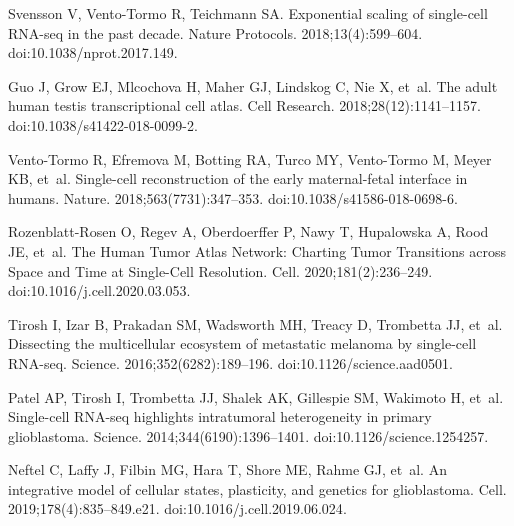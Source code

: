 \documentclass[10pt,letterpaper]{article}
\begin{document}
%
%
% 
\begin{thebibliography}{10}

Svensson V, Vento-Tormo R, Teichmann SA.
\newblock Exponential scaling of single-cell {RNA}-seq in the past decade.
\newblock Nature Protocols. 2018;13(4):599--604.
\newblock doi:{10.1038/nprot.2017.149}.

Guo J, Grow EJ, Mlcochova H, Maher GJ, Lindskog C, Nie X, et~al.
\newblock The adult human testis transcriptional cell atlas.
\newblock Cell Research. 2018;28(12):1141--1157.
\newblock doi:{10.1038/s41422-018-0099-2}.

Vento-Tormo R, Efremova M, Botting RA, Turco MY, Vento-Tormo M, Meyer KB,
  et~al.
\newblock Single-cell reconstruction of the early maternal-fetal interface in
  humans.
\newblock Nature. 2018;563(7731):347--353.
\newblock doi:{10.1038/s41586-018-0698-6}.

Rozenblatt-Rosen O, Regev A, Oberdoerffer P, Nawy T, Hupalowska A, Rood JE,
  et~al.
\newblock The Human Tumor Atlas Network: Charting Tumor Transitions across
  Space and Time at Single-Cell Resolution.
\newblock Cell. 2020;181(2):236--249.
\newblock doi:{10.1016/j.cell.2020.03.053}.

Tirosh I, Izar B, Prakadan SM, Wadsworth MH, Treacy D, Trombetta JJ, et~al.
\newblock Dissecting the multicellular ecosystem of metastatic melanoma by
  single-cell {RNA}-seq.
\newblock Science. 2016;352(6282):189--196.
\newblock doi:{10.1126/science.aad0501}.

Patel AP, Tirosh I, Trombetta JJ, Shalek AK, Gillespie SM, Wakimoto H, et~al.
\newblock Single-cell {RNA}-seq highlights intratumoral heterogeneity in
  primary glioblastoma.
\newblock Science. 2014;344(6190):1396--1401.
\newblock doi:{10.1126/science.1254257}.

Neftel C, Laffy J, Filbin MG, Hara T, Shore ME, Rahme GJ, et~al.
\newblock An integrative model of cellular states, plasticity, and genetics for
  glioblastoma.
\newblock Cell. 2019;178(4):835--849.e21.
\newblock doi:{10.1016/j.cell.2019.06.024}.


\end{thebibliography}
\end{document}
